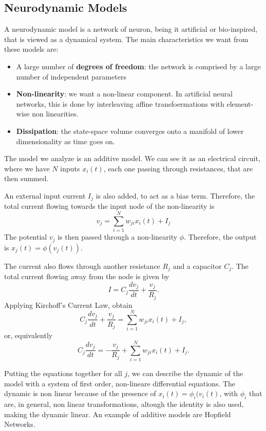 \documentclass[oneside]{book}
\theoremstyle{definition}
\theoremstyle{plain}
\begin{document}
\subsection{Neurodynamic Models}
A neurodynamic model is a network of neuron, being it artificial or bio-inspired, that is viewed as a dynamical system. The main characteristics we want from these models are:
\begin{itemize}
    \item A large number of \textbf{degrees of freedom}: the network is comprised by a large number of independent parameters
    \item \textbf{Non-linearity}: we want a non-linear component. In artificial neural networks, this is done by interleaving affine transfoermations with element-wise non linearities.
    \item \textbf{Dissipation}: the state-space volume converges onto a manifold of lower dimensionality as time goes on.
\end{itemize}
The model we analyze is an additive model. We can see it as an electrical circuit, where we have $N$ inputs $x_i(t)$, each one passing through resistances, that are then summed.

An external input current $I_j$ is also added, to act as a bias term. 
Therefore, the total current flowing towards the input node of the non-linearity is 
\begin{equation}
    v_j =\sum_{i=1}^N w_{ji} x_i(t)  +I_j
\end{equation}
The potential $v_j$ is then passed through a non-linearity $\phi$. Therefore, the output is $x_j(t) = \phi(v_j(t))$.

The current also flows through another resistance $R_j$ and a capacitor $C_j$.
The total current flowing away from the node is given by
\begin{equation}
    I= C_j \frac{dv_j}{dt} + \frac{v_j}{R_j}.
\end{equation}
Applying Kirchoff's Current Law, obtain
\begin{equation}
    C_j \frac{dv_j}{dt} + \frac{v_j}{R_j}  =\sum_{i=1}^N w_{ji} x_i(t)  +I_j,
\end{equation}
or, equivalently
\begin{equation}\label{eqn:kcl-additive}
    C_j \frac{dv_j}{dt} = - \frac{v_j}{R_j} + \sum_{i=1}^N w_{ji} x_i(t)  +I_j.
\end{equation}

Putting the equations together for all $j$, we can describe the dynamic of the model with a system of first order, non-lineare differential equations. The dynamic is non linear because of the presence of $x_i(t)=\phi_i(v_i(t)$, with $\phi_i$ that are, in general, non linear transformations, altough the identity is also used, making the dynamic linear.
An example of additive models are Hopfield Networks.
\end{document}
